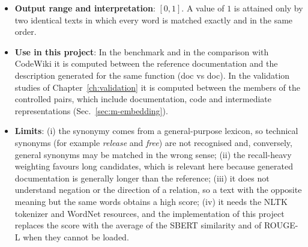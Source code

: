 \begin{itemize}[leftmargin=*, label=\textbullet]
	\item \textbf{Output range and interpretation}: $[0,1]$. A value of $1$ is attained only by
	two identical texts in which every word is matched exactly and in the same order.

	\item \textbf{Use in this project}: In the benchmark and in the comparison with CodeWiki it is
	computed between the reference documentation and the description generated for the same
	function (doc vs doc). In the validation studies of Chapter~\ref{ch:validation} it is computed
	between the members of the controlled pairs, which include documentation, code and intermediate
	representations (Sec.~\ref{sec:m-embedding}).

	\item \textbf{Limits}: (i) the synonymy comes from a general-purpose lexicon, so technical
	synonyms (for example \emph{release} and \emph{free}) are not recognised and, conversely, general
	synonyms may be matched in the wrong sense; (ii) the recall-heavy weighting favours long
	candidates, which is relevant here because generated documentation is generally longer than the
	reference; (iii) it does not understand negation or the direction of a relation, so a text with
	the opposite meaning but the same words obtains a high score; (iv) it needs the NLTK tokenizer and
	WordNet resources, and the implementation of this project replaces the score with the average of
	the SBERT similarity and of ROUGE-L when they cannot be loaded.
\end{itemize}

